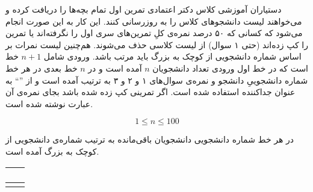 \gdef\thisproblemauthor{\rl{سپهر هاشمی}}
\begin{problem}{}
{}{}
{}{}{}
دستیاران آموزشی کلاس دکتر اعتمادی تمرین اول تمام بچه‌ها را دریافت کرده و می‌خواهند لیست دانشجوهای کلاس را به روزرسانی کنند. این کار به این صورت انجام می‌شود که کسانی که ۵۰ درصد نمره‌ی کلِ تمرین‌های سری اول را نگرفته‌اند یا تمرین را کپ زده‌اند (حتی ۱ سوال) از لیست کلاسی حذف می‌شوند. هم‌چنین لیست نمرات بر اساس شماره دانشجویی از کوچک به بزرگ باید مرتب باشد.
    \InputFile
 ورودی شامل $n + 1$ خط است که در خط اول ورودی تعداد دانشجویان  $n$ آمده است  و در $n$ خط بعدی در هر خط شماره دانشجوییِ دانشجو و نمره‌ی سوال‌های ۱ و ۲ و ۳ به ترتیب آمده است و از 
 \colorbox{gray!10}{''\lr{\texttt{,}}``}
 به عنوان جداکننده استفاده شده است.
 اگر تمرینی کپ زده شده باشد بجای نمره‌ی آن عبارت
 \colorbox{gray!10}{}
  نوشته شده است.

    $$ 1 \le n \le 100 $$

    \OutputFile

در هر خط شماره دانشجویی دانشجویان باقی‌مانده به ترتیب شماره‌ی دانشجویی از کوچک به بزرگ آمده است.
\Examples

\Example
\begin{center}
    \LTR
    \renewcommand{\arraystretch}{0}
    \begin{tabu} to 1.0\textwidth { | X[l] | X[l] | }
    \hline 
    \begin{center}
        \textbf{}
    \end{center}
    & \begin{center}
          \textbf{}
    \end{center}  \\
    \hline
    \texttt{}  & \texttt{}  \\
    \hline
    \end{tabu}
\end{center}


\end{problem}
